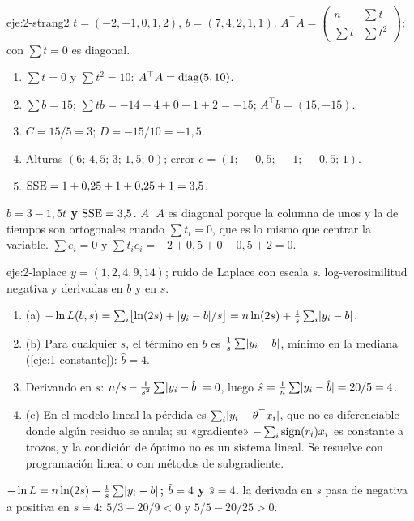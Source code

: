 \begin{solucion}{eje:2-strang2}
\datos $t=(-2,-1,0,1,2)$, $b=(7,4,2,1,1)$.
\planteamiento $A^{\top}A=\begin{pmatrix}n&\sum t\\\sum t&\sum t^{2}\end{pmatrix}$; con $\sum t=0$ es diagonal.
\pasos
\begin{enumerate}[label=\arabic*.]
  \item $\sum t=0$ y $\sum t^{2}=10$: $A^{\top}A=\operatorname{diag}(5,10)$.
  \item $\sum b=15$; $\sum tb=-14-4+0+1+2=-15$; $A^{\top}b=(15,-15)$.
  \item $C=15/5=3$; $D=-15/10=-1{,}5$.
  \item Alturas $(6;\,4{,}5;\,3;\,1{,}5;\,0)$; error $e=(1;\,-0{,}5;\,-1;\,-0{,}5;\,1)$.
  \item $\operatorname{SSE}=1+0{,}25+1+0{,}25+1=3{,}5$.
\end{enumerate}
\resultado \textbf{$b=3-1{,}5t$ y $\operatorname{SSE}=3{,}5$.} $A^{\top}A$ es diagonal porque la columna de unos y la de tiempos son ortogonales cuando $\sum t_i=0$, que es lo mismo que centrar la variable.
\comprobacion $\sum e_i=0$ y $\sum t_ie_i=-2+0{,}5+0-0{,}5+2=0$.
\end{solucion}

\begin{solucion}{eje:2-laplace}
\datos $y=(1,2,4,9,14)$; ruido de Laplace con escala $s$.
\planteamiento log-verosimilitud negativa y derivadas en $b$ y en $s$.
\pasos
\begin{enumerate}[label=\arabic*.]
  \item (a) $-\ln L(b,s)=\sum_i\bigl[\ln(2s)+\lvert y_i-b\rvert/s\bigr]=n\ln(2s)+\frac1s\sum_i\lvert y_i-b\rvert$.
  \item (b) Para cualquier $s$, el término en $b$ es $\frac1s\sum\lvert y_i-b\rvert$, mínimo en la mediana (\cref{eje:1-constante}): $\hat b=4$.
  \item Derivando en $s$: $n/s-\frac{1}{s^{2}}\sum\lvert y_i-\hat b\rvert=0$, luego $\hat s=\frac1n\sum\lvert y_i-\hat b\rvert=20/5=4$.
  \item (c) En el modelo lineal la pérdida es $\sum_i\lvert y_i-\theta^{\top}x_i\rvert$, que no es diferenciable donde algún residuo se anula; su «gradiente» $-\sum_i\operatorname{sign}(r_i)x_i$ es constante a trozos, y la condición de óptimo no es un sistema lineal. Se resuelve con programación lineal o con métodos de subgradiente.
\end{enumerate}
\resultado \textbf{$-\ln L=n\ln(2s)+\frac1s\sum\lvert y_i-b\rvert$; $\hat b=4$ y $\hat s=4$.}
\comprobacion la derivada en $s$ pasa de negativa a positiva en $s=4$: $5/3-20/9<0$ y $5/5-20/25>0$.
\end{solucion}

